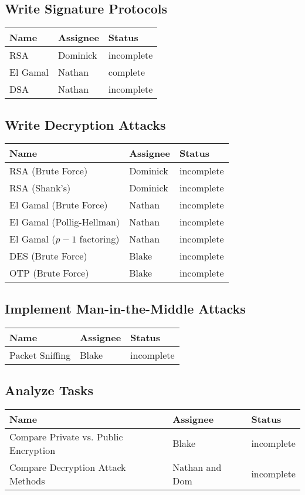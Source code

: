 \documentclass{report}
\begin{document}
\subsection{Write Signature Protocols}
\begin{tabular}{l|l|l}
    Name & Assignee & Status \\ \hline
    RSA & Dominick & incomplete \\
    El Gamal & Nathan & complete \\
    DSA & Nathan & incomplete	 
\end{tabular}

\subsection{Write Decryption Attacks}
\begin{tabular}{l|l|l}
    Name & Assignee & Status \\ \hline
    RSA (Brute Force) & Dominick & incomplete \\
    RSA (Shank's) & Dominick & incomplete \\
    El Gamal (Brute Force) & Nathan & incomplete \\
    El Gamal (Pollig-Hellman) & Nathan & incomplete \\
    El Gamal ($p-1$ factoring) & Nathan & incomplete \\
    DES (Brute Force) & Blake & incomplete \\
    OTP (Brute Force) & Blake & incomplete 
\end{tabular}

\subsection{Implement Man-in-the-Middle Attacks}
\begin{tabular}{l|l|l}
    Name & Assignee & Status \\ \hline
    Packet Sniffing & Blake & incomplete 
\end{tabular}

\subsection{Analyze Tasks}
\begin{tabular}{l|l|l}
    Name & Assignee & Status \\ \hline
    Compare Private vs. Public Encryption & Blake & incomplete \\
    Compare Decryption Attack Methods & Nathan and Dom & incomplete
\end{tabular}
\end{document}
